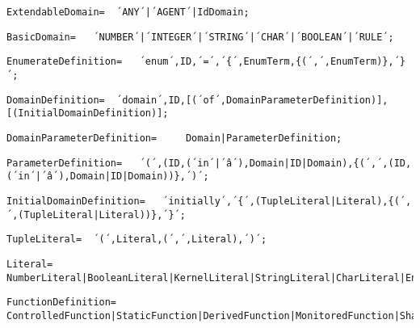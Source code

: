 \documentclass{article}
\begin{document}
    \begin{lstlisting}[mathescape=true]
     ExtendableDomain= 	´ANY´|´AGENT´|IdDomain;
    \end{lstlisting}
    
    \begin{lstlisting}[mathescape=true]
     BasicDomain= 	´NUMBER´|´INTEGER´|´STRING´|´CHAR´|´BOOLEAN´|´RULE´;
    \end{lstlisting}
    
    \begin{lstlisting}[mathescape=true]
     EnumerateDefinition= 	´enum´,ID,´=´,´{´,EnumTerm,{(´,´,EnumTerm)},´}´;
    \end{lstlisting}
    
    \begin{lstlisting}[mathescape=true]
     DomainDefinition= 	´domain´,ID,[(´of´,DomainParameterDefinition)],[(InitialDomainDefinition)];
    \end{lstlisting}
    
    \begin{lstlisting}[mathescape=true]
     DomainParameterDefinition= 	Domain|ParameterDefinition;
    \end{lstlisting}
    
    \begin{lstlisting}[mathescape=true]
     ParameterDefinition= 	´(´,(ID,(´in´|´â´),Domain|ID|Domain),{(´,´,(ID,(´in´|´â´),Domain|ID|Domain))},´)´;
    \end{lstlisting}
    
    \begin{lstlisting}[mathescape=true]
     InitialDomainDefinition= 	´initially´,´{´,(TupleLiteral|Literal),{(´,´,(TupleLiteral|Literal))},´}´;
    \end{lstlisting}
    
    \begin{lstlisting}[mathescape=true]
     TupleLiteral= 	´(´,Literal,(´,´,Literal),´)´;
    \end{lstlisting}
    
    \begin{lstlisting}[mathescape=true]
     Literal= 	NumberLiteral|BooleanLiteral|KernelLiteral|StringLiteral|CharLiteral|EnumTerm;
    \end{lstlisting}
    
    \begin{lstlisting}[mathescape=true]
     FunctionDefinition= 	ControlledFunction|StaticFunction|DerivedFunction|MonitoredFunction|SharedFunction|OutFunction;
    \end{lstlisting}
    
\end{document}
